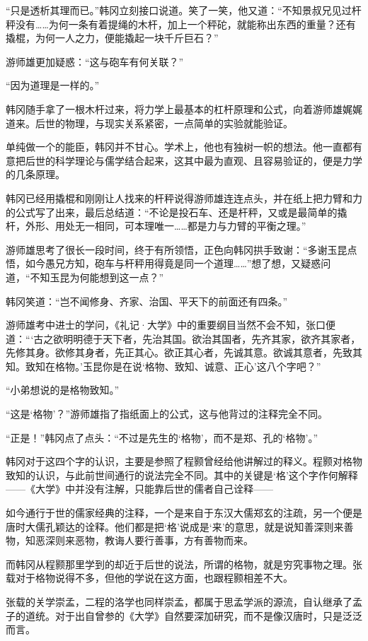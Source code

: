 “只是透析其理而已。”韩冈立刻接口说道。笑了一笑，他又道：“不知景叔兄见过杆秤没有……为何一条有着提绳的木杆，加上一个秤砣，就能称出东西的重量？还有撬棍，为何一人之力，便能撬起一块千斤巨石？”

游师雄更加疑惑：“这与砲车有何关联？”

“因为道理是一样的。”

韩冈随手拿了一根木杆过来，将力学上最基本的杠杆原理和公式，向着游师雄娓娓道来。后世的物理，与现实关系紧密，一点简单的实验就能验证。

单纯做一个的能臣，韩冈并不甘心。学术上，他也有独树一帜的想法。他一直都有意把后世的科学理论与儒学结合起来，这其中最为直观、且容易验证的，便是力学的几条原理。

韩冈已经用撬棍和刚刚让人找来的杆秤说得游师雄连连点头，并在纸上把力臂和力的公式写了出来，最后总结道：“不论是投石车、还是杆秤，又或是最简单的撬杆，外形、用处无一相同，可本理唯一……都是力与力臂的平衡之理。”

游师雄思考了很长一段时间，终于有所领悟，正色向韩冈拱手致谢：“多谢玉昆点悟，如今愚兄方知，砲车与杆秤用得竟是同一个道理……”想了想，又疑惑问道，“不知玉昆为何能想到这一点？”

韩冈笑道：“岂不闻修身、齐家、治国、平天下的前面还有四条。”

游师雄考中进士的学问，《礼记·大学》中的重要纲目当然不会不知，张口便道：“‘古之欲明明德于天下者，先治其国。欲治其国者，先齐其家，欲齐其家者，先修其身。欲修其身者，先正其心。欲正其心者，先诚其意。欲诚其意者，先致其知。致知在格物。’玉昆你是在说‘格物、致知、诚意、正心’这八个字吧？”

“小弟想说的是格物致知。”

“这是‘格物’？”游师雄指了指纸面上的公式，这与他背过的注释完全不同。

“正是！”韩冈点了点头：“不过是先生的‘格物’，而不是郑、孔的‘格物’。”

韩冈对于这四个字的认识，主要是参照了程颢曾经给他讲解过的释义。程颢对格物致知的认识，与此前世间通行的说法完全不同。其中的关键是‘格’这个字作何解释——《大学》中并没有注解，只能靠后世的儒者自己诠释——

如今通行于世的儒家经典的注释，一个是来自于东汉大儒郑玄的注疏，另一个便是唐时大儒孔颖达的诠释。他们都是把‘格’说成是‘来’的意思，就是说知善深则来善物，知恶深则来恶物，教诲人要行善事，方有善物而来。

而韩冈从程颢那里学到的却近于后世的说法，所谓的格物，就是穷究事物之理。张载对于格物说得不多，但他的学说在这方面，也跟程颢相差不大。

张载的关学崇孟，二程的洛学也同样崇孟，都属于思孟学派的源流，自认继承了孟子的道统。对于出自曾参的《大学》自然要深加研究，而不是像汉唐时，只是泛泛而言。

